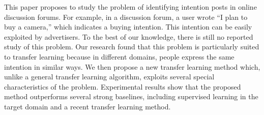 This paper proposes to study the problem of identifying intention posts in online discussion forums. For example, in a discussion forum, a user wrote ``I
 plan to buy a camera,'' which indicates a buying intention. This intention can
 be easily exploited by advertisers. To the best of our knowledge, there is
 still no reported study of this problem. Our research found that this problem
 is particularly suited to transfer learning because in different domains,
 people express the same intention in similar ways. We then propose a new
 transfer learning method which, unlike a general transfer learning algorithm,
 exploits several special characteristics of the problem. Experimental results
 show that the proposed method outperforms several strong baselines, including
 supervised learning in the target domain and a recent transfer learning method.

